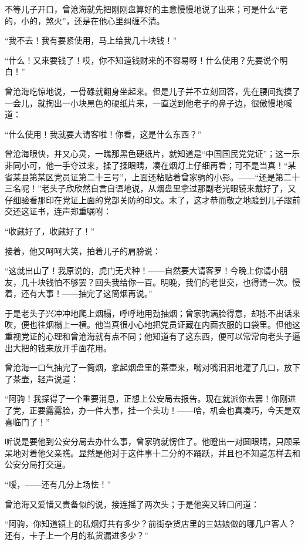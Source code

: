 \par 不等儿子开口，曾沧海就先把刚刚盘算好的主意慢慢地说了出来；可是什么“老的，小的，煞火”，还是在他心里纠缠不清。
\par “我不去！我有要紧使用，马上给我几十块钱！”
\par “什么！又来要钱了！哎，你不知道钱财来的不容易呀！什么使用？先要说个明白！”
\par 曾沧海吃惊地说，一骨碌就翻身坐起来。但是儿子并不立刻回答，先在腰间掏摸了一会儿，就掏出一小块黑色的硬纸片来，一直送到他老子的鼻子边，很傲慢地喊道：
\par “什么使用！我就要大请客啦！你看，这是什么东西？”
\par 曾沧海眼快，并又心灵，一瞧那黑色硬纸片，就知道是“中国国民党党证”；这一乐非同小可，他一手夺过来，揉了揉眼睛，凑在烟灯上仔细再看；可不是当真！“某省某县第某区党员证第二十三号”，上面还粘贴着曾家驹的小影。——“还是第二十三名呢！”老头子欣欣然自言自语地说，从烟盘里拿过那副老光眼镜来戴好了，又仔细验看那印在党证上面的党部关防的印文。末了，这才恭而敬之地踱到儿子跟前交还这证书，连声郑重嘱咐：
\par “收藏好了，收藏好了！”
\par 接着，他又呵呵大笑，拍着儿子的肩膀说：
\par “这就出山了！我原说的，虎门无犬种！——自然要大请客罗！今晚上你请小朋友，几十块钱怕不够罢？回头我给你一百。明晚，我们的老世交，也得请一次。慢着，还有大事！——抽完了这筒烟再说。”
\par 于是老头子兴冲冲地爬上烟榻，呼呼地用劲抽烟；曾家驹满脸得意，却拣不出话来吹，便也往烟榻上一横。他当真很小心地把党员证藏在内面衣服的口袋里。但他这重视党证的心理和曾沧海就有点不同；他知道有了这东西，便可以常常向老头子逼出大把的钱来放开手面花用。
\par 曾沧海一口气抽完了一筒烟，拿起烟盘里的茶壶来，嘴对嘴汩汩地灌了几口，放下了茶壶，轻声说道：
\par “阿驹！我探得了一个重要消息，正想上公安局去报告。现在就派你去罢！你刚进了党，正要露露脸，办一件大事，挂一个头功！——哈，机会也真凑巧，今天是双喜临门了！”
\par 听说是要他到公安分局去办什么事，曾家驹就愣住了。他瞪出一对圆眼睛，只顾呆呆地对着他父亲瞧。显然是他对于这件事十二分的不踊跃，并且也不知道怎样去和公安分局打交道。
\par “嗳，——还有几分上场怯！”
\par 曾沧海又爱惜又责备似的说，接连摇了两次头；于是他突又转口问道：
\par “阿驹，你知道镇上的私烟灯共有多少？前街杂货店里的三姑娘做的哪几户客人？还有，卡子上一个月的私货漏进多少？”
